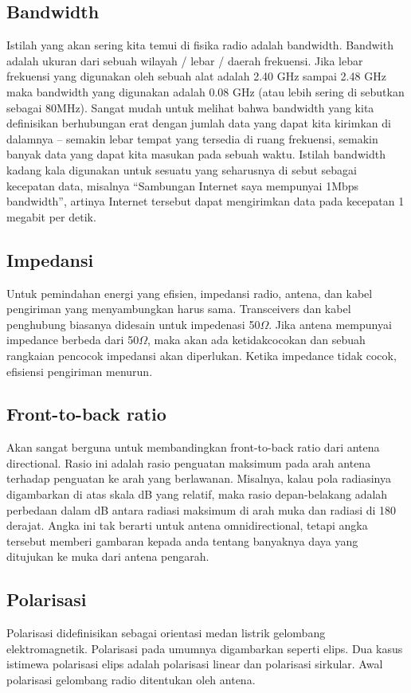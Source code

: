 \documentclass[a4paper,12pt]{article}
\begin{document}
\subsection{Bandwidth}
Istilah yang akan sering kita temui di fisika radio adalah bandwidth. Bandwith adalah ukuran
dari sebuah wilayah / lebar / daerah frekuensi. Jika lebar frekuensi yang digunakan oleh
sebuah alat adalah 2.40 GHz sampai 2.48 GHz maka bandwidth yang digunakan adalah 0.08
GHz (atau lebih sering di sebutkan sebagai 80MHz).
Sangat mudah untuk melihat bahwa bandwidth yang kita definisikan berhubungan erat
dengan jumlah data yang dapat kita kirimkan di dalamnya – semakin lebar tempat yang
tersedia di ruang frekuensi, semakin banyak data yang dapat kita masukan pada sebuah
waktu. Istilah bandwidth kadang kala digunakan untuk sesuatu yang seharusnya di sebut
sebagai kecepatan data, misalnya “Sambungan Internet saya mempunyai 1Mbps bandwidth”,
artinya Internet tersebut dapat mengirimkan data pada kecepatan 1 megabit per detik.

\subsection{Impedansi}
Untuk pemindahan energi yang efisien, impedansi radio, antena, dan kabel pengiriman yang
menyambungkan harus sama. Transceivers dan kabel penghubung biasanya
didesain untuk impedenasi 50$\Omega$. Jika antena mempunyai impedance berbeda dari 50$\Omega$, maka
akan ada ketidakcocokan dan sebuah rangkaian pencocok impedansi akan diperlukan. Ketika
impedance tidak cocok, efisiensi pengiriman menurun.

\subsection{Front-to-back ratio}
Akan sangat berguna untuk membandingkan front-to-back ratio dari antena directional. Rasio ini
adalah rasio penguatan maksimum pada arah antena terhadap penguatan ke arah yang
berlawanan. Misalnya, kalau pola radiasinya digambarkan di atas skala dB yang relatif, maka
rasio depan-belakang adalah perbedaan dalam dB antara radiasi maksimum di arah muka
dan radiasi di 180 derajat. Angka ini tak berarti untuk antena omnidirectional, tetapi angka
tersebut memberi gambaran kepada anda tentang banyaknya daya yang ditujukan ke muka
dari antena pengarah.

\subsection{Polarisasi}
Polarisasi didefinisikan sebagai orientasi medan listrik gelombang elektromagnetik. Polarisasi pada umumnya
digambarkan seperti elips. Dua kasus istimewa polarisasi elips adalah polarisasi linear dan polarisasi sirkular. Awal
polarisasi gelombang radio ditentukan oleh antena.
\end{document}
